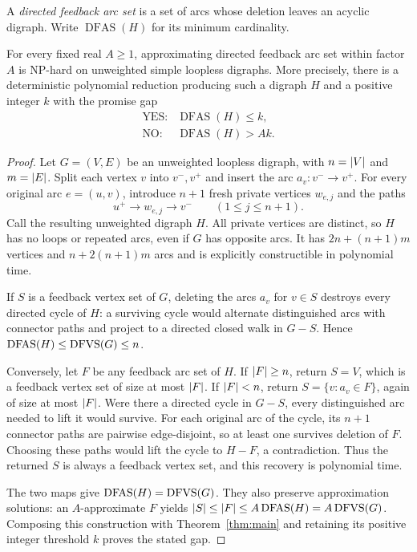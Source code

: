 A \emph{directed feedback arc set} is a set of arcs whose deletion leaves
an acyclic digraph.  Write $\operatorname{DFAS}(H)$ for its minimum
cardinality.

\begin{corollary}
\label{cor:feedback-arc}
For every fixed real $A\ge1$, approximating directed feedback arc set
within factor $A$ is NP-hard on unweighted simple loopless digraphs.
More precisely, there is a deterministic polynomial reduction producing
such a digraph $H$ and a positive integer $k$ with the promise gap
\[
  \begin{array}{ll}
    \text{YES:}&\operatorname{DFAS}(H)\le k,\\[2pt]
    \text{NO:}&\operatorname{DFAS}(H)>Ak.
  \end{array}
\]
\end{corollary}

\begin{proof}
Let $G=(V,E)$ be an unweighted loopless digraph, with $n=\lvert V\rvert$ and
$m=\lvert E\rvert$.  Split each vertex $v$ into $v^-,v^+$ and insert the arc
$a_v:v^-\to v^+$.  For every original arc $e=(u,v)$, introduce $n+1$
fresh private vertices $w_{e,j}$ and the paths
\[
  u^+\longrightarrow w_{e,j}\longrightarrow v^-\qquad(1\le j\le n+1).
\]
Call the resulting unweighted digraph $H$.  All private vertices are
distinct, so $H$ has no loops or repeated arcs, even if $G$ has opposite
arcs.  It has $2n+(n+1)m$ vertices and $n+2(n+1)m$ arcs and is explicitly
constructible in polynomial time.

If $S$ is a feedback vertex set of $G$, deleting the arcs $a_v$ for
$v\in S$ destroys every directed cycle of $H$: a surviving cycle would
alternate distinguished arcs with connector paths and project to a
directed closed walk in $G-S$.  Hence
$\operatorname{DFAS}(H)\le\operatorname{DFVS}(G)\le n$.

Conversely, let $F$ be any feedback arc set of $H$.  If $\lvert F\rvert\ge n$,
return $S=V$, which is a feedback vertex set of size at most $\lvert F\rvert$.
If $\lvert F\rvert<n$, return $S=\{v:a_v\in F\}$, again of size at most
$\lvert F\rvert$.  Were there a directed cycle in $G-S$, every distinguished arc
needed to lift it would survive.  For each original arc of the cycle,
its $n+1$ connector paths are pairwise edge-disjoint, so at least one
survives deletion of $F$.  Choosing these paths would lift the cycle to
$H-F$, a contradiction.  Thus the returned $S$ is always a feedback
vertex set, and this recovery is polynomial time.

The two maps give $\operatorname{DFAS}(H)=\operatorname{DFVS}(G)$.  They also preserve
approximation solutions: an $A$-approximate $F$ yields
$\lvert S\rvert\le\lvert F\rvert\le A\operatorname{DFAS}(H)=A\operatorname{DFVS}(G)$.
Composing this construction with Theorem~\ref{thm:main} and retaining its
positive integer threshold $k$ proves the stated gap.
\end{proof}
